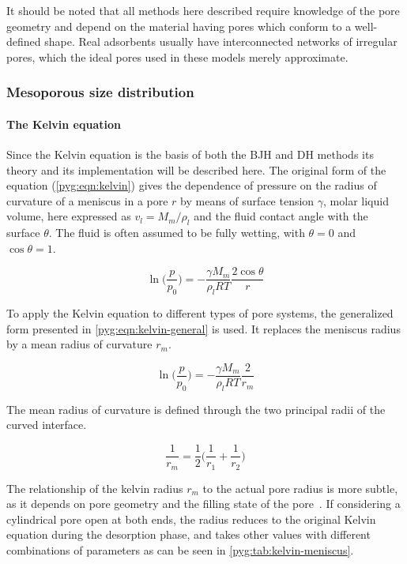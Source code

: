 It should be noted that all methods here described require knowledge of
the pore geometry and depend on the material having pores which
conform to a well-defined shape. Real adsorbents usually have
interconnected networks of irregular pores, which the ideal pores
used in these models merely approximate.

\subsubsection{Mesoporous size distribution}

\paragraph{The Kelvin equation}

Since the Kelvin equation is the basis of both the BJH and DH methods
its theory and its implementation will be described here. The original
form of the equation (\autoref{pyg:eqn:kelvin}) gives the dependence
of pressure on the radius of curvature of a meniscus in a pore \(r\) by
means of surface tension \(\gamma\), molar liquid volume, here expressed
as \(v_l=M_m/\rho_l\) and the fluid contact angle with the surface
\(\theta\). The fluid is often assumed to be fully wetting, with
\(\theta=0\) and \(\cos\theta=1\).

\begin{equation}\label{pyg:eqn:kelvin}
	\ln\Big(\frac{p}{p_0}\Big) = -\frac{\gamma M_m}{\rho_l RT}\frac{2 \cos\theta}{r}
\end{equation}

To apply the Kelvin equation to different types of pore systems, the
generalized form presented in \autoref{pyg:eqn:kelvin-general}
is used. It replaces the meniscus radius by a mean radius of curvature
\(r_m\).

\begin{equation}\label{pyg:eqn:kelvin-general}
	\ln\Big(\frac{p}{p_0}\Big) = -\frac{\gamma M_m}{\rho_l RT}\frac{2}{r_m}
\end{equation}

The mean radius of curvature is defined through the two principal
radii of the curved interface.

\begin{equation}\label{pyg:eqn:kelvin-mradius}
	\frac{1}{r_m} = \frac{1}{2}\Big(\frac{1}{r_1}+\frac{1}{r_2}\Big)
\end{equation}

The relationship of the kelvin radius \(r_m\) to the actual pore
radius is more subtle, as it depends on pore geometry and the
filling state of the pore~\cite{doAdsorptionAnalysisEquilibria1998}.
If considering a cylindrical pore open at both ends, the radius reduces
to the original Kelvin equation during the desorption phase, and takes
other values with different combinations of parameters
as can be seen in \autoref{pyg:tab:kelvin-meniscus}.

